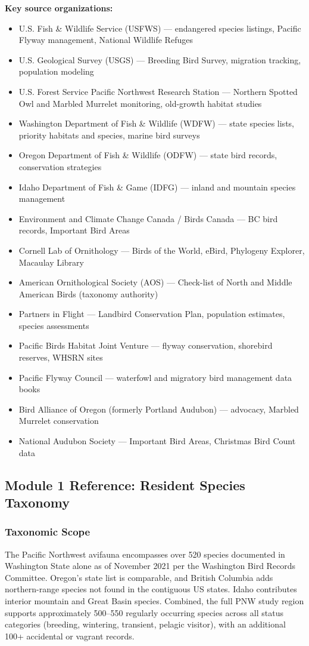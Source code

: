 \documentclass[11pt,letterpaper]{article}
\begin{document}
\textbf{Key source organizations:}
\begin{itemize}[leftmargin=2em]
\item U.S. Fish \& Wildlife Service (USFWS) --- endangered species listings, Pacific Flyway management, National Wildlife Refuges
\item U.S. Geological Survey (USGS) --- Breeding Bird Survey, migration tracking, population modeling
\item U.S. Forest Service Pacific Northwest Research Station --- Northern Spotted Owl and Marbled Murrelet monitoring, old-growth habitat studies
\item Washington Department of Fish \& Wildlife (WDFW) --- state species lists, priority habitats and species, marine bird surveys
\item Oregon Department of Fish \& Wildlife (ODFW) --- state bird records, conservation strategies
\item Idaho Department of Fish \& Game (IDFG) --- inland and mountain species management
\item Environment and Climate Change Canada / Birds Canada --- BC bird records, Important Bird Areas
\item Cornell Lab of Ornithology --- Birds of the World, eBird, Phylogeny Explorer, Macaulay Library
\item American Ornithological Society (AOS) --- Check-list of North and Middle American Birds (taxonomy authority)
\item Partners in Flight --- Landbird Conservation Plan, population estimates, species assessments
\item Pacific Birds Habitat Joint Venture --- flyway conservation, shorebird reserves, WHSRN sites
\item Pacific Flyway Council --- waterfowl and migratory bird management data books
\item Bird Alliance of Oregon (formerly Portland Audubon) --- advocacy, Marbled Murrelet conservation
\item National Audubon Society --- Important Bird Areas, Christmas Bird Count data
\end{itemize}

\subsection{Module 1 Reference: Resident Species Taxonomy}

\subsubsection{Taxonomic Scope}
The Pacific Northwest avifauna encompasses over 520 species documented in Washington State alone as of November 2021 per the Washington Bird Records Committee. Oregon's state list is comparable, and British Columbia adds northern-range species not found in the contiguous US states. Idaho contributes interior mountain and Great Basin species. Combined, the full PNW study region supports approximately 500--550 regularly occurring species across all status categories (breeding, wintering, transient, pelagic visitor), with an additional 100+ accidental or vagrant records.
\end{document}
